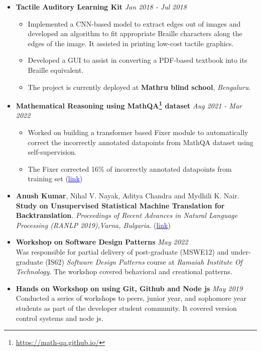 \documentclass[11pt,a4paper]{article}
\begin{document}
{
\colorbox{gray}{}
\begin{itemize}
    \item \textbf{Tactile Auditory Learning Kit} \hfill \textit{Jan 2018 - Jul 2018}
    \begin{itemize}
        \item Implemented a CNN-based model to extract edges out of images and developed an algorithm to fit appropriate Braille characters along the edges of the image. It assisted in printing low-cost tactile graphics.
        \item Developed a GUI to assist in converting a PDF-based textbook into its Braille equivalent. 
        \item The project is currently deployed at \textbf{Mathru blind school}, \emph{Bengaluru}.
    \end{itemize}
    \item \textbf{Mathematical Reasoning using MathQA\footnote{\url{ https://math-qa.github.io/}} dataset} \hfill \textit{Aug 2021 - Mar 2022}
     \begin{itemize}
         \item Worked on building a transformer based Fixer module to automatically correct the incorrectly annotated datapoints from MathQA dataset using self-supervision.
         \item The Fixer corrected 16\% of incorrectly annotated datapoints from training set (\href{https://github.com/anushkumarv/Language_models_explore_numeracy}{\textcolor{blue}{link}}) 
     \end{itemize}   
\end{itemize}
}
{
\colorbox{gray}{}
\begin{itemize}
    \item \textbf{Anush Kumar}, Nihal V. Nayak, Aditya Chandra and Mydhili K. Nair. \textbf{Study on Unsupervised Statistical Machine Translation for Backtranslation}. \textit{Proceedings of Recent Advances in Natural Language Processing (RANLP 2019),Varna, Bulgaria}. (\href{https://aclanthology.org/R19-1068/}{\textcolor{blue}{link}}) 
\end{itemize}
}
{
\colorbox{gray}{}
\begin{itemize}
    \item \textbf{Workshop on Software Design Patterns} \hfill \textit{May 2022}
    \\Was responsible for partial delivery of post-graduate (MSWE12) and under-graduate (IS62) \textit{Software Design Patterns} course at \textit{Ramaiah Institute Of Technology}. The workshop covered behavioral and creational patterns.
\end{itemize}
\begin{itemize}
    \item \textbf{Hands on Workshop on using  Git, Github and Node js} \hfill \textit{May 2019}
    \\Conducted a series of workshops to peers, junior year, and sophomore year students as part of the developer student community. It covered version control systems and node js.
\end{itemize}
}
\end{document}
